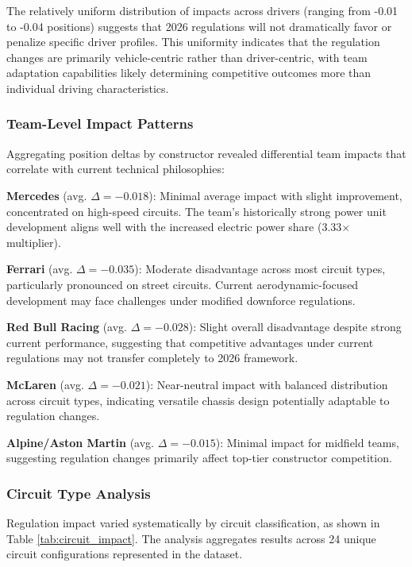 \documentclass[conference]{IEEEtran}
\begin{document}
The relatively uniform distribution of impacts across drivers (ranging from -0.01 to -0.04 positions) suggests that 2026 regulations will not dramatically favor or penalize specific driver profiles. This uniformity indicates that the regulation changes are primarily vehicle-centric rather than driver-centric, with team adaptation capabilities likely determining competitive outcomes more than individual driving characteristics.

\subsubsection{Team-Level Impact Patterns}

Aggregating position deltas by constructor revealed differential team impacts that correlate with current technical philosophies:

\textbf{Mercedes} (avg. $\Delta = -0.018$): Minimal average impact with slight improvement, concentrated on high-speed circuits. The team's historically strong power unit development aligns well with the increased electric power share (3.33$\times$ multiplier).

\textbf{Ferrari} (avg. $\Delta = -0.035$): Moderate disadvantage across most circuit types, particularly pronounced on street circuits. Current aerodynamic-focused development may face challenges under modified downforce regulations.

\textbf{Red Bull Racing} (avg. $\Delta = -0.028$): Slight overall disadvantage despite strong current performance, suggesting that competitive advantages under current regulations may not transfer completely to 2026 framework.

\textbf{McLaren} (avg. $\Delta = -0.021$): Near-neutral impact with balanced distribution across circuit types, indicating versatile chassis design potentially adaptable to regulation changes.

\textbf{Alpine/Aston Martin} (avg. $\Delta = -0.015$): Minimal impact for midfield teams, suggesting regulation changes primarily affect top-tier constructor competition.

\subsubsection{Circuit Type Analysis}

Regulation impact varied systematically by circuit classification, as shown in Table \ref{tab:circuit_impact}. The analysis aggregates results across 24 unique circuit configurations represented in the dataset.
\end{document}
